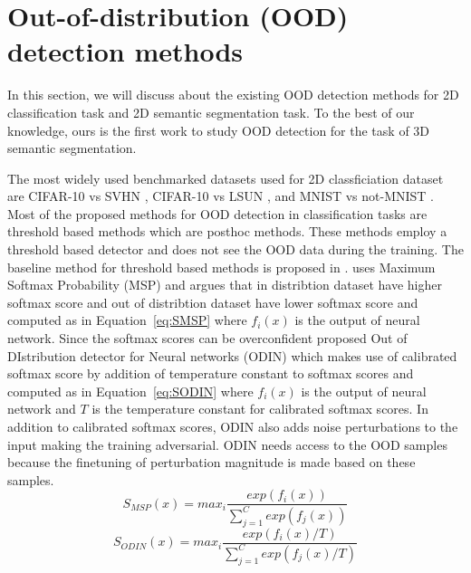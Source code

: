     
    
    \section{Out-of-distribution (OOD) detection methods}
    In this section, we will discuss about the existing OOD detection methods for 2D classification task and 2D semantic segmentation task.
    To the best of our knowledge, ours is the first work to study OOD detection for the task of 3D semantic segmentation.

    The most widely used benchmarked datasets used for 2D classficiation dataset are CIFAR-10 vs SVHN \cite{liang2017enhancing_ODIN}, CIFAR-10 vs LSUN \cite{hendrycks2016baseline_MSP}, and MNIST vs not-MNIST \cite{hendrycks2016baseline_MSP}. 
    Most of the proposed methods for OOD detection in classification tasks are threshold based methods which are posthoc methods.
    These methods employ a threshold based detector and does not see the OOD data during the training.
    The baseline method for threshold based methods is proposed in \cite{hendrycks2016baseline_MSP}.
    \cite{hendrycks2016baseline_MSP} uses Maximum Softmax Probability (MSP) and argues that in distribtion dataset have higher softmax score and out of distribtion dataset have lower softmax score and computed as in Equation~\ref{eq:SMSP} where $f_i(x)$ is the output of neural network.
    Since the softmax scores can be overconfident \cite{liang2017enhancing_ODIN} proposed Out of DIstribution detector for Neural networks (ODIN) which makes use of calibrated softmax score by addition of temperature constant to softmax scores and computed as in Equation~\ref{eq:SODIN} where $f_i(x)$ is the output of neural network and $T$ is the temperature constant for calibrated softmax scores.
    In addition to calibrated softmax scores, ODIN also adds noise perturbations to the input making the training adversarial.
    ODIN needs access to the OOD samples because the finetuning of perturbation magnitude is made based on these samples.
    \begin{equation}
        S_{MSP}(x) = max_i \frac{exp(f_i(x))}{\sum^{C}_{j=1}exp(f_j(x))}  \label{eq:SMSP}
    \end{equation}
    \begin{equation}
        S_{ODIN}(x) = max_i \frac{exp(f_i(x)/T)}{\sum^{C}_{j=1}exp(f_j(x)/T)}  \label{eq:SODIN}
    \end{equation}
